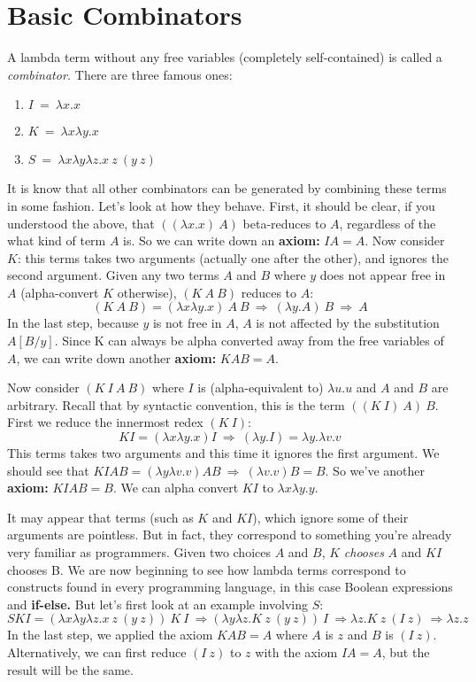 \section{Basic Combinators}

A lambda term without any free variables (completely self-contained) is
called a {\em combinator.}  There are three famous ones:
\begin{enumerate}
\item $I ~=~ \lambda x.x$
\item $K ~=~ \lambda x\lambda y.x$
\item $S ~=~ \lambda x\lambda y\lambda z.x~z~(y~ z)$  
\end{enumerate}
It is know that all other combinators can be generated by combining these
terms in some fashion.  Let's look at how they behave. First, it should
be clear, if you understood the above, that $((\lambda x.x)~ A)$ beta-reduces
to $A$, regardless of the what kind of term $A$ is.  So we can write down
an {\bf axiom:} $IA = A$.
Now consider $K$: this terms takes two arguments (actually one after the other),
and ignores the second argument.  Given any two terms $A$ and $B$ where $y$
does not appear free in $A$ (alpha-convert $K$ otherwise), $(K~A~B)$ reduces
to $A$:
$$(K~A~B) = (\lambda x\lambda y.x)~A~B ~\Rightarrow~ (\lambda y.A)~B
~\Rightarrow~ A$$
In the last step, because $y$ is not free in $A$, $A$ is not affected by the
substitution $A[B/y]$.  Since K can always be alpha converted away from the
free variables of $A$, we can write down another {\bf axiom:} $KAB = A$.

Now consider $(K~ I~ A~ B)$ where $I$ is (alpha-equivalent to) $\lambda u.u$
and $A$ and $B$ are arbitrary.  Recall that by syntactic convention, this is
the term $((K~ I)~A)~B$.  First we reduce the innermost redex $(K~I)$:
$$KI = (\lambda x\lambda y.x)I ~\Rightarrow~ (\lambda y.I) = \lambda y.\lambda v.v$$ This terms takes two arguments and this time it ignores the first argument.
We should see that
$KIAB = (\lambda y\lambda v.v)AB ~\Rightarrow~ (\lambda v.v) B = B$.
So we've another {\bf axiom:} $KIAB=B$.
We can alpha convert $KI$ to $\lambda x\lambda y.y$.

It may appear that terms (such as $K$ and $KI$), which ignore some of their
arguments are pointless. But in fact, they correspond to something you're already
very familiar as programmers.  Given two choices $A$ and $B$, $K$ {\em chooses\/}
$A$ and $KI$ chooses B.  We are now beginning to see how lambda terms correspond
to constructs found in every programming language, in this case Boolean
expressions and {\bf if-else.\/}
But let's first look at an example involving $S$:
$$
SKI = (\lambda x\lambda y\lambda z.x~z~(y~ z))~K~I ~\Rightarrow
(\lambda y\lambda z.K~z~(y~z))~ I ~\Rightarrow
\lambda z.K~z~(I~z)  ~\Rightarrow \lambda z.z$$
In the last step, we applied the axiom $KAB=A$ where $A$ is $z$ and
$B$ is $(I~z)$.  Alternatively, we can first reduce $(I~z)$ to $z$ with the
axiom $IA=A$, but the result will be the same.

